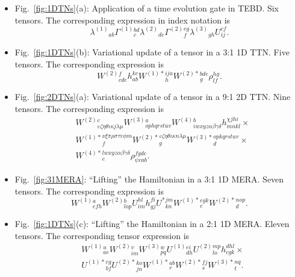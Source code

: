 \documentclass[aps,pre,reprint,superscriptaddress,amsfonts,amsmath,showpacs,nofootinbib,floatfix]{revtex4-1}
\newcommand{\fref}[1]{Fig.~\ref{#1}}
\begin{document}
\begin{itemize}
\item \fref{fig:1DTNs}(a): Application of a time evolution gate in TEBD. Six tensors. The corresponding expression in index notation is
\begin{equation}
\lambda^{(1)}{}_{ab}\Gamma^{(1)}{}^{bd}_c\lambda^{(2)}{}_{de}\Gamma^{(2)}{}^{eg}_f\lambda^{(3)}{}_{gh}U^{cf}_{ij}\label{eq:TEBD}.
\end{equation}
\item \fref{fig:1DTNs}(b): Variational update of a tensor in a 3:1 1D TTN. Five tensors. The corresponding expression is
\begin{equation}
W^{(2)}{}^f_{cde}h^{kc}_{ab}W^{(1)*}{}^{ija}_hW^{(2)*}{}^{bde}_g\rho^{hg}_{lf}.\label{eq:1DTTN}
\end{equation}
\item \fref{fig:2DTNs}(a): Variational update of a tensor in a 9:1 2D TTN. Nine tensors. The corresponding expression is
\begin{equation}
\begin{split}
&W^{(2)}{}^c_{\varepsilon\zeta\eta\theta\iota\kappa j\lambda\mu}W^{(3)}{}^a_{ophqrstuv}W^{(4)}{}^b_{iwxyz\alpha\beta\gamma\delta} h^{\chi jhi}_{mnkl} \times\\
&W^{(1)*}{}^{\nu\xi\pi\rho\sigma\tau\upsilon\phi m}_f W^{(2)*}{}^{\varepsilon\zeta\eta\theta\iota\kappa n \lambda\mu}_g W^{(3)*}{}^{opkqrstuv}_d\times\\ 
&W^{(4)*}{}^{lwxyz\alpha\beta\gamma\delta}_e \rho^{fgde}_{\psi cab}.
\end{split}\label{eq:2DTTN}
\end{equation}
\item \fref{fig:31MERA}: ``Lifting'' the Hamiltonian in a 3:1 1D MERA. Seven tensors. The corresponding expression is
\begin{equation}
W^{(1)}{}^{a}_{efh}W^{(2)}{}^{b}_{lop}U^{hl}_{im}h^{fi}_{gj}U^*{}^{jm}_{kn}W^{(1)*}{}^{egk}_c W^{(2)*}{}^{nop}_d\label{eq:31MERA}.
\end{equation}
\item \fref{fig:1DTNs}(c): ``Lifting'' the Hamiltonian in a 2:1 1D MERA. Eleven tensors. The corresponding tensor expression is
\begin{equation}
\begin{split}
&W^{(1)}{}^u_{ae} W^{(2)}{}^v_{im} W^{(3)}{}^w_{pq} U^{(1)}{}^{ei}_{dh} U^{(2)}{}^{mp}_{lo} h^{dhl}_{cgk}\times\\
& U^{(1)*}{}^{cg}_{bf} U^{(2)*}{}^{ko}_{jn} W^{(1)*}{}^{ab}_r W^{(2)*}{}^{fj}_s W^{(3)*}{}^{nq}_t.

\end{split}
\end{equation}
\end{itemize}
\end{document}
